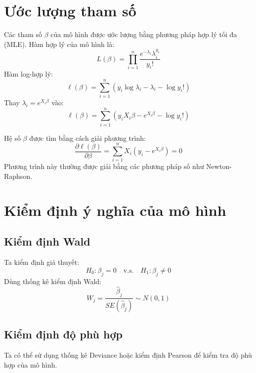 \section{Ước lượng tham số}
Các tham số $\beta$ của mô hình được ước lượng bằng phương pháp hợp lý tối đa (MLE). Hàm hợp lý của mô hình là:
\begin{equation}
    L(\beta) = \prod_{i=1}^{n} \frac{e^{-\lambda_i} \lambda_i^{y_i}}{y_i!}
\end{equation}
Hàm log-hợp lý:
\begin{equation}
    \ell(\beta) = \sum_{i=1}^{n} \left(y_i \log \lambda_i - \lambda_i - \log y_i! \right)
\end{equation}
Thay $\lambda_i = e^{X_i \beta}$ vào:
\begin{equation}
    \ell(\beta) = \sum_{i=1}^{n} \left(y_i X_i \beta - e^{X_i \beta} - \log y_i! \right)
\end{equation}

Hệ số $\beta$ được tìm bằng cách giải phương trình:
\begin{equation}
    \frac{\partial \ell(\beta)}{\partial \beta} = \sum_{i=1}^{n} X_i (y_i - e^{X_i \beta}) = 0
\end{equation}
Phương trình này thường được giải bằng các phương pháp số như Newton-Raphson.

\section{Kiểm định ý nghĩa của mô hình}
\subsection{Kiểm định Wald}
Ta kiểm định giả thuyết:
\begin{equation}
    H_0: \beta_j = 0 \quad \text{v.s.} \quad H_1: \beta_j \neq 0
\end{equation}
Dùng thống kê kiểm định Wald:
\begin{equation}
    W_j = \frac{\hat{\beta}_j}{SE(\hat{\beta}_j)} \sim N(0,1)
\end{equation}

\subsection{Kiểm định độ phù hợp}
Ta có thể sử dụng thống kê Deviance hoặc kiểm định Pearson để kiểm tra độ phù hợp của mô hình.